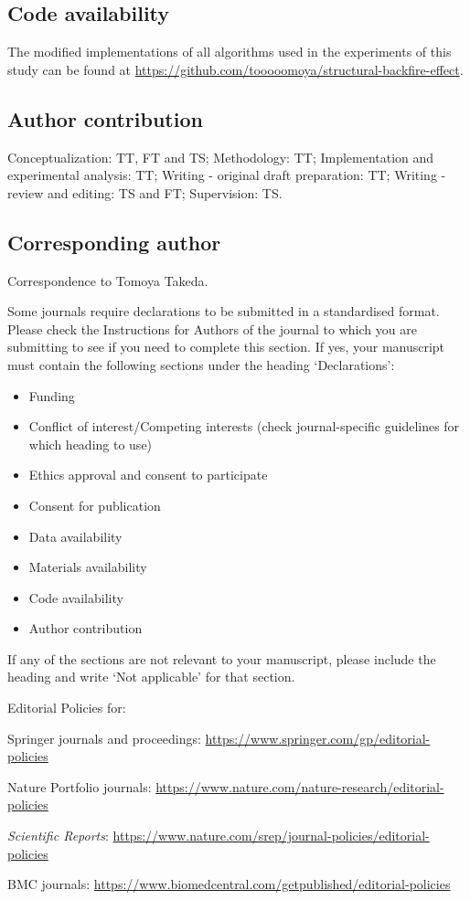 \documentclass[pdflatex,sn-mathphys-num]{sn-jnl}%
\theoremstyle{thmstyleone}%
\theoremstyle{thmstyletwo}%
\theoremstyle{thmstylethree}%
\begin{document}
\subsection*{Code availability}
The modified implementations of all algorithms
used in the experiments of this study can be found at \url{https://github.com/tooooomoya/structural-backfire-effect}.
\subsection*{Author contribution}
Conceptualization: TT, FT and TS; Methodology: TT;
Implementation and experimental analysis: TT; Writing - original
draft preparation: TT; Writing - review and editing: TS and FT;
Supervision: TS.
\subsection*{Corresponding author}
Correspondence to Tomoya Takeda.




\iffalse
  Some journals require declarations to be submitted in a standardised format. Please check the Instructions for Authors of the journal to which you are submitting to see if you need to complete this section. If yes, your manuscript must contain the following sections under the heading `Declarations':

\begin{itemize}
\item Funding
\item Conflict of interest/Competing interests (check journal-specific guidelines for which heading to use)
\item Ethics approval and consent to participate
\item Consent for publication
\item Data availability
\item Materials availability
\item Code availability
\item Author contribution
\end{itemize}

\noindent
If any of the sections are not relevant to your manuscript, please include the heading and write `Not applicable' for that section.


\bigskip
\begin{flushleft}%
Editorial Policies for:

\bigskip\noindent
Springer journals and proceedings: \url{https://www.springer.com/gp/editorial-policies}

\bigskip\noindent
Nature Portfolio journals: \url{https://www.nature.com/nature-research/editorial-policies}

\bigskip\noindent
\textit{Scientific Reports}: \url{https://www.nature.com/srep/journal-policies/editorial-policies}

\bigskip\noindent
BMC journals: \url{https://www.biomedcentral.com/getpublished/editorial-policies}
\end{flushleft}
\end{document}
